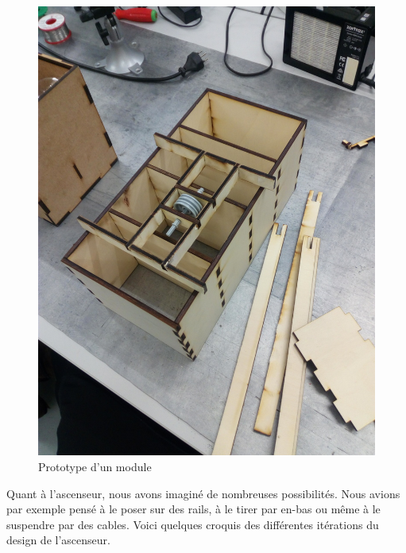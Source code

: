 \begin{figure}[H]
  \centering
  \includegraphics[scale=0.3]{building_process/prototype_module}
  \caption{Prototype d'un module}
  \label{fig:bp_prototype}
\end{figure}

Quant à l'ascenseur, nous avons imaginé de nombreuses possibilités.
Nous avions par exemple pensé à le poser sur des rails, à le tirer par en-bas ou même à le suspendre par des cables. Voici quelques croquis des différentes itérations du design de l'ascenseur.

